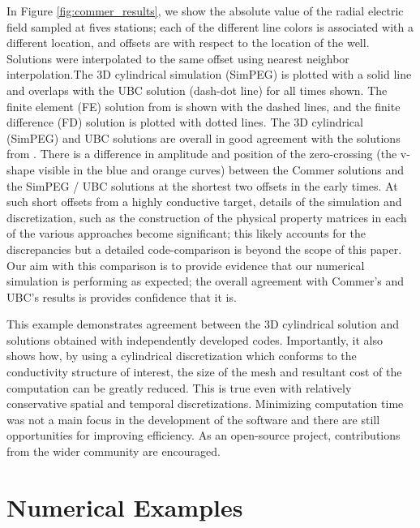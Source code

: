 


In Figure \ref{fig:commer_results}, we show the absolute value of the radial electric field sampled at fives stations; each of the different line colors is associated with a different location, and offsets are with respect to the location of the well. Solutions were interpolated to the same offset using nearest neighbor interpolation.The 3D cylindrical simulation (SimPEG) is plotted with a solid line and overlaps with the UBC solution (dash-dot line) for all times shown. The finite element (FE) solution from \cite{Commer2015} is shown with the dashed lines, and the finite difference (FD) solution is plotted with dotted lines. The 3D cylindrical (SimPEG) and UBC solutions are overall in good agreement with the solutions from \cite{Commer2015}. There is a difference in amplitude and position of the zero-crossing (the v-shape visible in the blue and orange curves) between the Commer solutions and the SimPEG / UBC solutions at the shortest two offsets in the early times. At such short offsets from a highly conductive target, details of the simulation and discretization, such as the construction of the physical property matrices in each of the various approaches become significant; this likely accounts for the discrepancies but a detailed code-comparison is beyond the scope of this paper. Our aim with this comparison is to provide evidence that our numerical simulation is performing as expected; the overall agreement with Commer’s and UBC’s results is provides confidence that it is.




This example demonstrates agreement between the 3D cylindrical solution and solutions obtained with independently developed codes. Importantly, it also shows how, by using a cylindrical discretization which conforms to the conductivity structure of interest, the size of the mesh and resultant cost of the computation can be greatly reduced. This is true even with relatively conservative spatial and temporal discretizations. Minimizing computation time was not a main focus in the development of the software and there are still opportunities for improving efficiency. As an open-source project, contributions from the wider community are encouraged.
\section{Numerical Examples}
\label{sec:numerical_examples}

